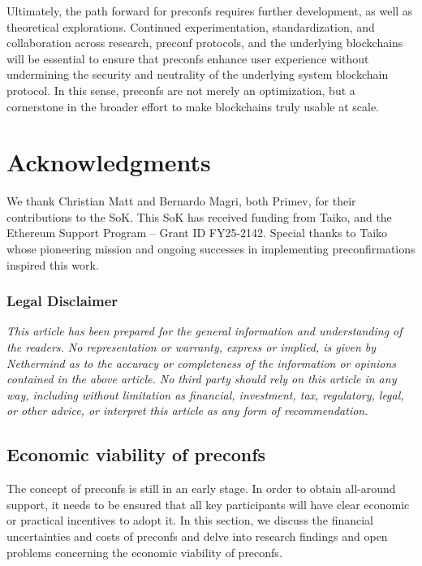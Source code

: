\documentclass[a4paper]{article}
\theoremstyle{boldstyle}
\begin{document}
Ultimately, the path forward for preconfs requires further development, as well as theoretical explorations. Continued experimentation, standardization, and collaboration across research, preconf protocols, and the underlying blockchains will be essential to ensure that preconfs enhance user experience without undermining the security and neutrality of the underlying system blockchain protocol. In this sense, preconfs are not merely an optimization, but a cornerstone in the broader effort to make blockchains truly usable at scale.
\fi
\section*{Acknowledgments}

We thank Christian Matt and Bernardo Magri, both Primev, for their contributions to the SoK. This SoK has received funding from Taiko, and the Ethereum Support Program -- Grant ID FY25-2142. Special thanks to Taiko whose pioneering mission and ongoing successes in implementing preconfirmations inspired this work.

\subsubsection*{Legal Disclaimer}

\textit{This article has been prepared for the general information and understanding of the readers. No representation or warranty, express or implied, is given by Nethermind as to the accuracy or completeness of the information or opinions contained in the above article. No third party should rely on this article in any way, including without limitation as financial, investment, tax, regulatory, legal, or other advice, or interpret this article as any form of recommendation.}


\newpage

% 


% 

\iffalse
\appendix
\subsection{Economic viability of preconfs} 
    The concept of preconfs is still in an early stage. In order to obtain all-around support, it needs to be ensured that all key participants will have clear economic or practical incentives to adopt it. In this section, we discuss the financial uncertainties and costs of preconfs and delve into research findings and open problems concerning the economic viability of preconfs. 
    
\end{document}
